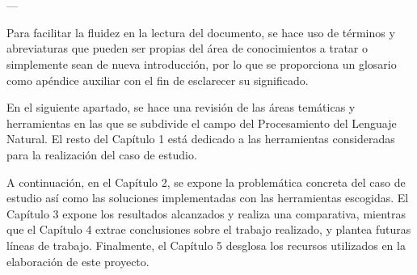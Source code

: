 \chapter{\ChapterOne{}}



---

Para facilitar la fluidez en la lectura del documento, se hace uso de términos y abreviaturas que pueden ser propias del área de conocimientos a tratar o simplemente sean de nueva introducción, por lo que se proporciona un glosario como apéndice auxiliar con el fin de esclarecer su significado.

En el siguiente apartado, se hace una revisión de las áreas temáticas y herramientas en las que se subdivide el campo del Procesamiento del Lenguaje Natural. El resto del Capítulo 1 está dedicado a las herramientas consideradas para la realización del caso de estudio.







\vskip 20pt

A continuación, en el Capítulo 2, se expone la problemática concreta del caso de estudio así como las soluciones implementadas con las herramientas escogidas. El Capítulo 3 expone los resultados alcanzados y realiza una comparativa, mientras que el Capítulo 4 extrae conclusiones sobre el trabajo realizado, y plantea futuras líneas de trabajo. Finalmente, el Capítulo 5 desglosa los recursos utilizados en la elaboración de este proyecto.